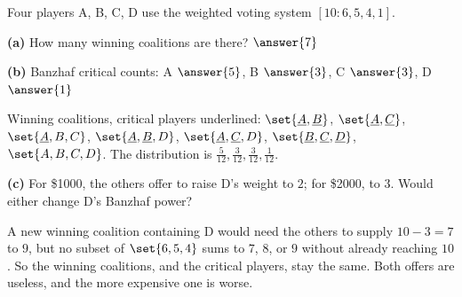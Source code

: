 \documentclass[12pt]{ximera}
\begin{document}
\begin{problem}
Four players A, B, C, D use the weighted voting system $[10:6,5,4,1]$.

\begin{prompt}
\textbf{(a)} How many winning coalitions are there? $\answer{7}$
\end{prompt}

\begin{prompt}
\textbf{(b)} Banzhaf critical counts: A $\answer{5}$, B $\answer{3}$, C $\answer{3}$,
D $\answer{1}$
\begin{feedback}
Winning coalitions, critical players underlined:
$\set{\underline A,\underline B}$, $\set{\underline A,\underline C}$,
$\set{\underline A,B,C}$, $\set{\underline A,\underline B,D}$,
$\set{\underline A,\underline C,D}$, $\set{\underline B,\underline C,\underline D}$,
$\set{A,B,C,D}$. The distribution is $\frac5{12},\frac3{12},\frac3{12},\frac1{12}$.
\end{feedback}
\end{prompt}

\begin{prompt}
\textbf{(c)} For \$1000, the others offer to raise D's weight to $2$; for \$2000, to $3$.
Would either change D's Banzhaf power?
\begin{multipleChoice}
\end{multipleChoice}
\begin{feedback}
A new winning coalition containing D would need the others to supply $10-3=7$ to $9$, but
no subset of $\set{6,5,4}$ sums to $7$, $8$, or $9$ without already reaching $10$. So
the winning coalitions, and the critical players, stay the same. Both offers are useless,
and the more expensive one is worse.
\end{feedback}
\end{prompt}
\end{problem}
\end{document}

